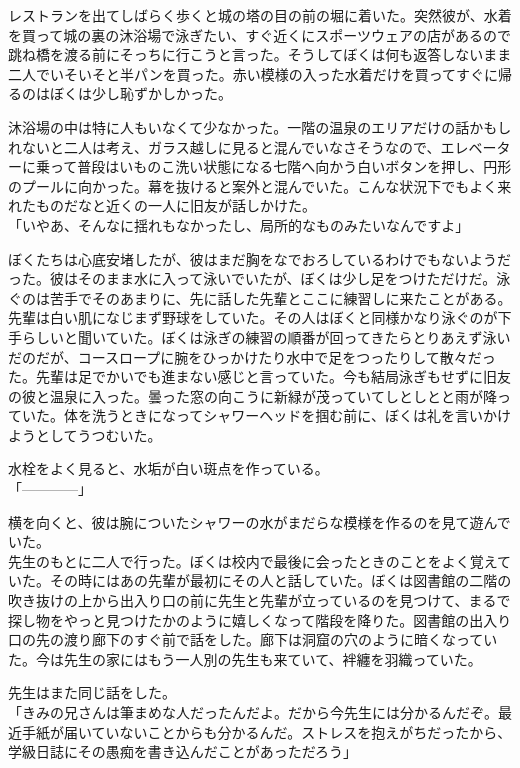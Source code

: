 \documentclass[b5j,twoside,twocolumn]{utarticle}
\begin{document}
レストランを出てしばらく歩くと城の塔の目の前の堀に着いた。突然彼が、水着を買って城の裏の沐浴場で泳ぎたい、すぐ近くにスポーツウェアの店があるので跳ね橋を渡る前にそっちに行こうと言った。そうしてぼくは何も返答しないまま二人でいそいそと半パンを買った。赤い模様の入った水着だけを買ってすぐに帰るのはぼくは少し恥ずかしかった。


沐浴場の中は特に人もいなくて少なかった。一階の温泉のエリアだけの話かもしれないと二人は考え、ガラス越しに見ると混んでいなさそうなので、エレベーターに乗って普段はいものこ洗い状態になる七階へ向かう白いボタンを押し、円形のプールに向かった。幕を抜けると案外と混んでいた。こんな状況下でもよく来れたものだなと近くの一人に旧友が話しかけた。\\
「いやあ、そんなに揺れもなかったし、局所的なものみたいなんですよ」


ぼくたちは心底安堵したが、彼はまだ胸をなでおろしているわけでもないようだった。彼はそのまま水に入って泳いでいたが、ぼくは少し足をつけただけだ。泳ぐのは苦手でそのあまりに、先に話した先輩とここに練習しに来たことがある。先輩は白い肌になじまず野球をしていた。その人はぼくと同様かなり泳ぐのが下手らしいと聞いていた。ぼくは泳ぎの練習の順番が回ってきたらとりあえず泳いだのだが、コースロープに腕をひっかけたり水中で足をつったりして散々だった。先輩は足でかいでも進まない感じと言っていた。今も結局泳ぎもせずに旧友の彼と温泉に入った。曇った窓の向こうに新緑が茂っていてしとしとと雨が降っていた。体を洗うときになってシャワーヘッドを掴む前に、ぼくは礼を言いかけようとしてうつむいた。


水栓をよく見ると、水垢が白い斑点を作っている。\\
「\tbaselineshift=2.5pt------\tbaselineshift=4.0pt\tbaselineshift=2.5pt------\tbaselineshift=4.0pt」


横を向くと、彼は腕についたシャワーの水がまだらな模様を作るのを見て遊んでいた。\\



先生のもとに二人で行った。ぼくは校内で最後に会ったときのことをよく覚えていた。その時にはあの先輩が最初にその人と話していた。ぼくは図書館の二階の吹き抜けの上から出入り口の前に先生と先輩が立っているのを見つけて、まるで探し物をやっと見つけたかのように嬉しくなって階段を降りた。図書館の出入り口の先の渡り廊下のすぐ前で話をした。廊下は洞窟の穴のように暗くなっていた。今は先生の家にはもう一人別の先生も来ていて、袢纏を羽織っていた。


先生はまた同じ話をした。\\
「きみの兄さんは筆まめな人だったんだよ。だから今先生には分かるんだぞ。最近手紙が届いていないことからも分かるんだ。ストレスを抱えがちだったから、学級日誌にその愚痴を書き込んだことがあっただろう」
\end{document}

